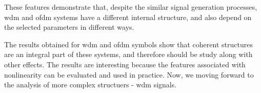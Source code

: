 These features demonstrate that, despite the similar signal generation processes, \acrshort{wdm} and \acrshort{ofdm} systems have a different internal structure, and also depend on the selected parameters in different ways. 

The results obtained for \acrshort{wdm} and \acrshort{ofdm} symbols show that coherent structures are an integral part of these systems, and therefore should be study along with other effects. The results are interesting because the features associated with nonlinearity can be evaluated and used in practice. Now, we moving forward to the analysis of more complex structuers - \gls{wdm} signals.